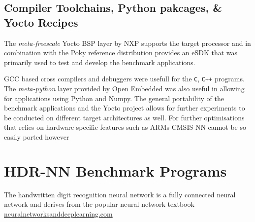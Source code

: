 \subsection{Compiler Toolchains, Python pakcages, \& Yocto Recipes}

The \textit{meta-freescale} Yocto BSP layer by NXP supports the target processor and in combination with the Poky reference distribution provides an eSDK that was primarily used to test and develop the benchmark applications.

GCC based cross compilers and debuggers were usefull for the \verb!C!, \verb!C++!  programs. The \textit{meta-python} layer provided by Open Embedded was also useful in allowing for applications using Python and Numpy. The general portability of the benchmark applications and the Yocto project allows for further experiments to be conducted on different target architectures as well. For further optimisations that relies on hardware specific features such as ARM\textquotesingle s CMSIS-NN cannot be so easily ported however

\section[Handwritten Digit Recognition (HDR)]{HDR-NN Benchmark Programs}

The handwritten digit recognition neural network is a fully connected neural network and derives from the popular neural network textbook \href{http://neuralnetworksanddeeplearning.com}{neuralnetworksanddeeplearning.com}

